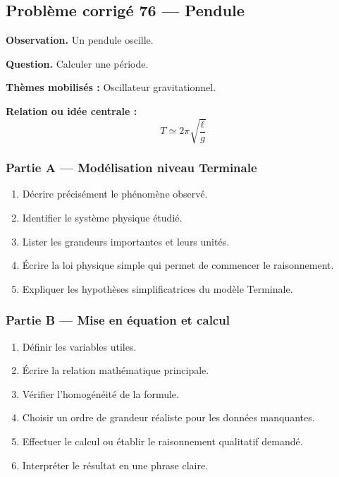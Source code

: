 \documentclass[11pt,a4paper]{article}
\begin{document}
\subsection{Problème corrigé 76 — Pendule}

\begin{exercicebox}
\textbf{Observation.} Un pendule oscille.

\medskip
\textbf{Question.} Calculer une période.

\medskip
\textbf{Thèmes mobilisés :} Oscillateur gravitationnel.

\medskip
\textbf{Relation ou idée centrale :}
\[
T\simeq2\pi\sqrt{\frac{\ell}{g}}
\]
\end{exercicebox}

\subsubsection*{Partie A — Modélisation niveau Terminale}

\begin{enumerate}
  \item Décrire précisément le phénomène observé.
  \item Identifier le système physique étudié.
  \item Lister les grandeurs importantes et leurs unités.
  \item Écrire la loi physique simple qui permet de commencer le raisonnement.
  \item Expliquer les hypothèses simplificatrices du modèle Terminale.
\end{enumerate}

\subsubsection*{Partie B — Mise en équation et calcul}

\begin{enumerate}
  \item Définir les variables utiles.
  \item Écrire la relation mathématique principale.
  \item Vérifier l'homogénéité de la formule.
  \item Choisir un ordre de grandeur réaliste pour les données manquantes.
  \item Effectuer le calcul ou établir le raisonnement qualitatif demandé.
  \item Interpréter le résultat en une phrase claire.
\end{enumerate}
\end{document}
